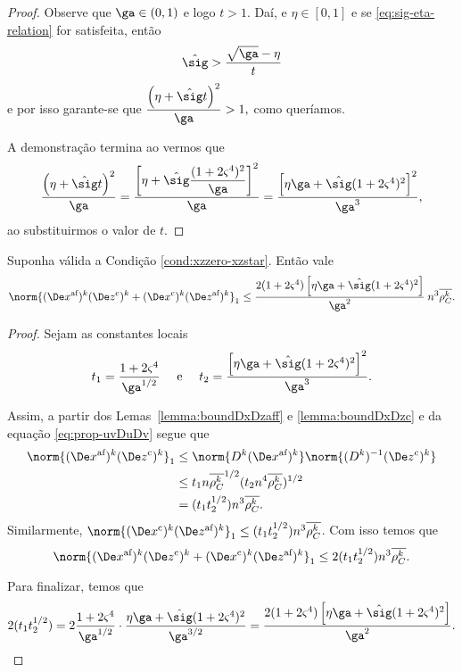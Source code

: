 \begin{proof}
Observe que $\ga\in(0,1)$ e logo $t > 1$.  Daí, e $\eta\in[0,1]$ e   se \eqref{eq:sig-eta-relation} for satisfeita, então 
\[
\nextsig > \dfrac{\sqrt{\ga} - \eta}{t}
\]
e por isso garante-se que 
$
	\dfrac{\left(\eta +{\nextsig} t \right)^{2}}{\ga} >1,
$
como queríamos.

A demonstração termina ao vermos que 
\[
	\dfrac{\left(\eta +{\nextsig} t \right)^{2}}{\ga} = \dfrac{\left[\eta + \nextsig\dfrac{(1+2\bdxzstar^{4})^{2}}{\ga}\right]^{2}}{\ga} = \dfrac{\left[\eta\ga + \nextsig(1+2\bdxzstar^{4})^{2}\right]^{2}}{\ga^{3}},
\] ao substituirmos o valor de $t$. \qedhere






\end{proof}

\begin{lema}\label{lemma:boundDxDzaff-c}
	Suponha válida a Condição  \ref{cond:xzzero-xzstar}. Então vale 
	\begin{equation}\label{eq:lemma-boundDxDzaff-c}
		\norm{ \dekx\Dekcoz + \Dekcox  \dekz  }_{1} \leq \dfrac{2(1+2\bdxzstar^{4})\left[\eta\ga + \nextsig(1+2\bdxzstar^{4})^{2}\right]}{\ga^{2}}\: n^{3}\rhoCkb.
	\end{equation}

\end{lema}

\begin{proof}  Sejam as constantes locais
\[
t_{1} = \frac{1 + 2\bdxzstar^{4} }{\ga^{1/2}} \quad \text{ e } \quad t_{2} = \dfrac{\left[\eta\ga + \nextsig(1+2\bdxzstar^{4})^{2}\right]^{2}}{\ga^{3}}.
\]
 
	 Assim, a partir  dos Lemas~\ref{lemma:boundDxDzaff} e \ref{lemma:boundDxDzc} e da equação \eqref{eq:prop-uvDuDv} segue que  
	\[
	\begin{aligned}	
		\norm{ \dekx \Dekcoz}_{1} & \leq \norm{\Dk \dekx }\norm{\Dik\Dekcoz}\\
							  & \leq 	t_1 n\rhoCkb ^{1/2}(t_2 n^{4}\rhoCkb )^{1/2}  \\
							  & = (t_1t_2^{1/2})n^{3}\rhoCkb .
	\end{aligned}\]			  
Similarmente, 	$\norm{\Dekcox \dekz }_{1} \leq (t_1t_2^{1/2})n^{3}\rhoCkb $. Com isso temos  que 
\[
		\norm{ \dekx \Dekcoz + \Dekcox \dekz }_{1} \leq 2(t_1t_2^{1/2})n^{3}\rhoCkb .
\]

Para finalizar, temos que  
\[
2(t_1t_2^{1/2}) = 2\frac{1 + 2\bdxzstar^{4} }{\ga^{1/2}} \cdot \dfrac{\eta\ga + \nextsig(1+2\bdxzstar^{4})^{2}}{\ga^{3/2}} = \dfrac{2(1+2\bdxzstar^{4})\left[\eta\ga + \nextsig(1+2\bdxzstar^{4})^{2}\right]}{\ga^{2}}. \qedhere
\]
\end{proof}

